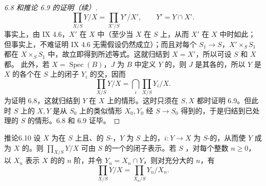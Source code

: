 \begin{proof}[ 6.8 和推论 6.9 的证明（续）]
\[\prod_{X/S}Y/X=\prod_{X'/S}Y'/X',\qquad Y'=Y\cap X'.\]
事实上，由 IX 4.6，$X'$ 在 $X$ 中（至少当 $X$ 在 $S$ 上，从而 $X'$ 在 $X$ 中时如此；但事实上，不难证明 IX 4.6 无需假设仍然成立）；而且对每个 $S_1\to S$，$X'\times_S S_1$ 都在 $X\times_S S_1$ 中，故立即得到所述等式。这就归结到 $X=X'$，所以可设 $S$ 和 $X$ 都。
此外，若 $X=\operatorname{Spec}(B)$，$J$ 为 $B$ 中定义 $Y$ 的，则 $J$ 是其各的，所以 $Y$ 是 $X$ 的各个在 $S$ 上的闭子 $Y_i$ 的交，因而
\[\prod_{X/S}Y/X=\bigcap_i\prod_{X/S}Y_i/X.\]
为证明 6.8，这就归结到 $Y$ 在 $X$ 上的情形。这时只须在 $S,X$ 都时证明 6.9。但此时 $S$ 上的 $X,Y$ 是从 $S_0$ 上的类似情形 $X_0,Y_0$ 经 $S\to S_0$ 得到的，于是归结到已处理的 $S$ 的情形。6.8 和 6.9 证毕。
\end{proof}
\begin{SGAresult}{推论}{6.10}
设 $X$ 为在 $S$ 上且、的 $S$-，$Y$ 为 $S$ 上的，$i:Y\to X$ 为 $S$-的，从而使 $Y$ 成为 $X$ 的。则 $\prod_{X/S}Y/X$ 可由 $S$ 的一个的闭子表示。若 $S$ ，对每个整数 $n\ge0$，以 $X_n$ 表示 $X$ 的的 $n$ 阶，并令 $Y_n=X_n\cap Y$，则对充分大的 $n$，有
\[\prod_{X/S}Y/X=\prod_{X_n/S}Y_n/X_n.\]
\end{SGAresult}
